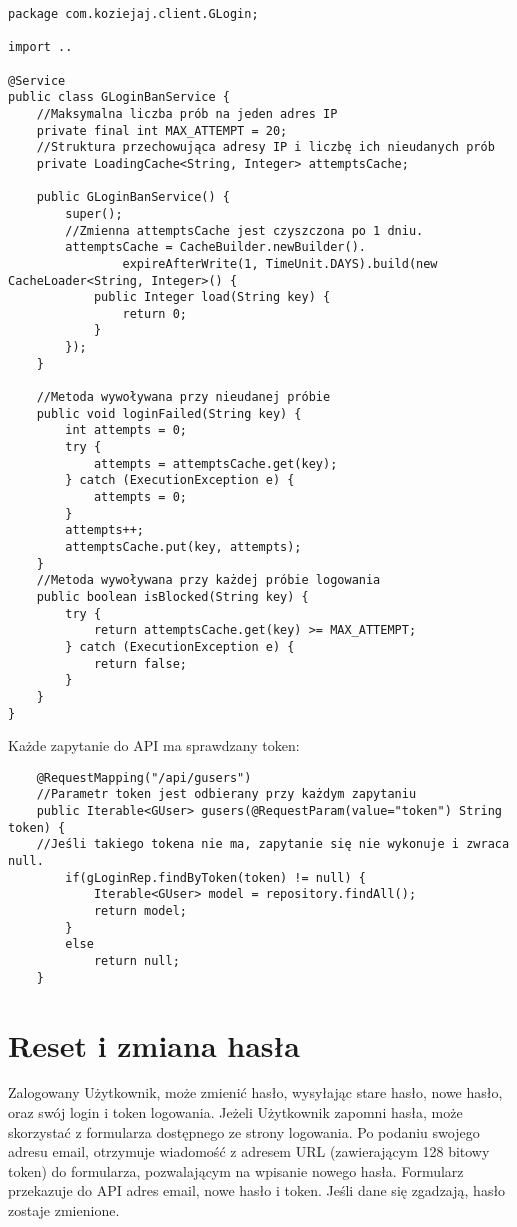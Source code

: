 \documentclass[a4paper,12pt,twoside,openany]{report}
\begin{document}
\begin{lstlisting}
package com.koziejaj.client.GLogin;

import ..

@Service
public class GLoginBanService {
	//Maksymalna liczba prób na jeden adres IP
    private final int MAX_ATTEMPT = 20;
    //Struktura przechowująca adresy IP i liczbę ich nieudanych prób
    private LoadingCache<String, Integer> attemptsCache;

    public GLoginBanService() {
        super();
        //Zmienna attemptsCache jest czyszczona po 1 dniu.
        attemptsCache = CacheBuilder.newBuilder().
                expireAfterWrite(1, TimeUnit.DAYS).build(new CacheLoader<String, Integer>() {
            public Integer load(String key) {
                return 0;
            }
        });
    }
    
	//Metoda wywoływana przy nieudanej próbie
    public void loginFailed(String key) {
        int attempts = 0;
        try {
            attempts = attemptsCache.get(key);
        } catch (ExecutionException e) {
            attempts = 0;
        }
        attempts++;
        attemptsCache.put(key, attempts);
    }
	//Metoda wywoływana przy każdej próbie logowania
    public boolean isBlocked(String key) {
        try {
            return attemptsCache.get(key) >= MAX_ATTEMPT;
        } catch (ExecutionException e) {
            return false;
        }
    }
}

\end{lstlisting}
Każde zapytanie do API ma sprawdzany token:
\begin{lstlisting}
    @RequestMapping("/api/gusers")
    //Parametr token jest odbierany przy każdym zapytaniu
    public Iterable<GUser> gusers(@RequestParam(value="token") String token) {
    //Jeśli takiego tokena nie ma, zapytanie się nie wykonuje i zwraca null.
        if(gLoginRep.findByToken(token) != null) {
            Iterable<GUser> model = repository.findAll();
            return model;
        }
        else
            return null;
    }
\end{lstlisting}
\section{Reset i zmiana hasła}
Zalogowany Użytkownik, może zmienić hasło, wysyłając stare hasło, nowe hasło, oraz swój login i token logowania. Jeżeli Użytkownik zapomni hasła, może skorzystać z formularza dostępnego ze strony logowania. Po podaniu swojego adresu email, otrzymuje wiadomość z adresem URL (zawierającym 128 bitowy token) do formularza, pozwalającym na wpisanie nowego hasła. Formularz przekazuje do API adres email, nowe hasło i token. Jeśli dane się zgadzają, hasło zostaje zmienione.
\end{document}
